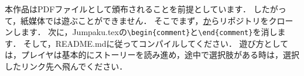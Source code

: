 本作品はPDFファイルとして頒布されることを前提としています．
したがって，紙媒体では遊ぶことができません．
そこでまず，\href{https://github.com/hyoiutu/techbookfest_localstudents_2017}からリポジトリをクローンします．
次に，Jumpaku.texの\verb`\begin{comment}`と\verb`\end{comment}`を消します．
そして，README.mdに従ってコンパイルしてください．
遊び方としては，プレイヤは基本的にストーリーを読み進め，途中で選択肢がある時は，選択したリンク先へ飛んでください．
\begin{comment}
\section{愛の仲間}\label{section:jumpakubegin}
私の名は\ruby[g]{愛}{あい}（\ref{fig:jumpakuI}）．
探偵である．
私には8人の仲間
\ruby[g]{恵伊}{えい}（\ref{fig:jumpakuA}），
\ruby[g]{美衣}{びい}（\ref{fig:jumpakuB}），
\ruby[g]{史衣}{しい}（\ref{fig:jumpakuC}），
\ruby[g]{出井}{でい}（\ref{fig:jumpakuD}），
\ruby[g]{良威}{いい}（\ref{fig:jumpakuE}），
\ruby[g]{恵夫}{えふ}（\ref{fig:jumpakuF}），
\ruby[g]{寺井}{じい}（\ref{fig:jumpakuG}），
\ruby[g]{永一}{えいいち}（\ref{fig:jumpakuH}）がいた．
\begin{figure}[b]\centering
\begin{tabular}{cccc}
\begin{minipage}{0.2\textwidth}\texttt{[image: \\jumpakuasset/A.png]}\caption{恵伊}\label{fig:jumpakuA}\end{minipage}
\begin{minipage}{0.2\textwidth}\texttt{[image: \\jumpakuasset/B.png]}\caption{美衣}\label{fig:jumpakuB}\end{minipage}
\begin{minipage}{0.2\textwidth}\texttt{[image: \\jumpakuasset/C.png]}\caption{史衣}\label{fig:jumpakuC}\end{minipage}
\begin{minipage}{0.2\textwidth}\texttt{[image: \\jumpakuasset/D.png]}\caption{出井}\label{fig:jumpakuD}\end{minipage}\\
\begin{minipage}{0.2\textwidth}\texttt{[image: \\jumpakuasset/E.png]}\caption{良威}\label{fig:jumpakuE}\end{minipage}
\begin{minipage}{0.2\textwidth}\texttt{[image: \\jumpakuasset/F.png]}\caption{恵夫}\label{fig:jumpakuF}\end{minipage}

\end{comment}
